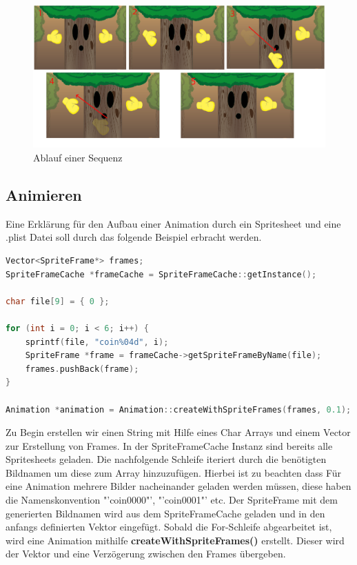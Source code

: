 \begin{figure}[H]
  \centering
  \includegraphics[width=15.5cm]{resources/dokubaum}
  \caption{Ablauf einer Sequenz}
  \label{fig:dokubaum} 
\end{figure}

\subsection{Animieren}
Eine Erklärung für den Aufbau einer Animation durch ein Spritesheet und eine .plist Datei soll durch das folgende Beispiel erbracht werden.

\begin{lstlisting}[label=lst:build_josie_animation,
				   language=C++,
				   firstnumber=53,
				   caption=Animation erstellen ( CollisionLayer.cpp )]
Vector<SpriteFrame*> frames;
SpriteFrameCache *frameCache = SpriteFrameCache::getInstance();

char file[9] = { 0 };

for (int i = 0; i < 6; i++) {
	sprintf(file, "coin%04d", i);
	SpriteFrame *frame = frameCache->getSpriteFrameByName(file);
	frames.pushBack(frame);
}

Animation *animation = Animation::createWithSpriteFrames(frames, 0.1);
\end{lstlisting}

Zu Begin erstellen wir einen String mit Hilfe eines Char Arrays und einem Vector zur Erstellung von Frames. In der SpriteFrameCache Instanz sind bereits alle Spritesheets geladen. Die nachfolgende Schleife iteriert durch die benötigten Bildnamen um diese zum Array hinzuzufügen. Hierbei ist zu beachten dass Für eine Animation mehrere Bilder nacheinander geladen werden müssen, diese haben die Namenskonvention "'coin0000"', "'coin0001"' etc. Der SpriteFrame mit dem generierten Bildnamen wird aus dem SpriteFrameCache geladen und in den anfangs definierten Vektor eingefügt. 
Sobald die For-Schleife abgearbeitet ist, wird eine Animation mithilfe \textbf{createWithSpriteFrames()} erstellt. Dieser wird der Vektor und eine Verzögerung zwischen den Frames übergeben.

